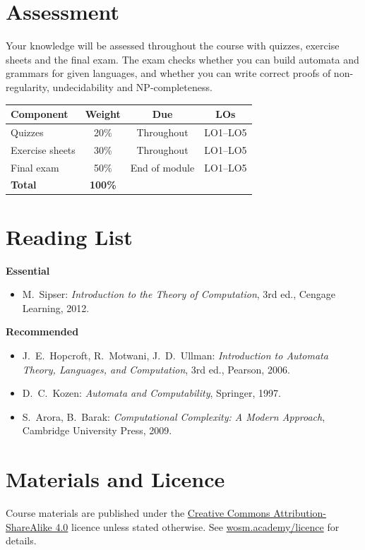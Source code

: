 \documentclass[11pt,a4paper]{article}
\begin{document}
\section{Assessment}
Your knowledge will be assessed throughout the course with quizzes, exercise sheets
and the final exam. The exam checks whether you can build automata and grammars for
given languages, and whether you can write correct proofs of non-regularity,
undecidability and NP-completeness.

\begin{tabularx}{\textwidth}{X c c c}
\toprule
\textbf{Component} & \textbf{Weight} & \textbf{Due} & \textbf{LOs} \\
\midrule
Quizzes & 20\% & Throughout & LO1--LO5 \\
Exercise sheets & 30\% & Throughout & LO1--LO5 \\
Final exam & 50\% & End of module & LO1--LO5 \\
\midrule
\textbf{Total} & \textbf{100\%} & & \\
\bottomrule
\end{tabularx}

\section{Reading List}
\textbf{Essential}
\begin{itemize}
  \item M.\ Sipser: \textit{Introduction to the Theory of Computation}, 3rd ed., Cengage Learning, 2012.
\end{itemize}
\textbf{Recommended}
\begin{itemize}
  \item J.\ E.\ Hopcroft, R.\ Motwani, J.\ D.\ Ullman: \textit{Introduction to Automata Theory, Languages, and Computation}, 3rd ed., Pearson, 2006.
  \item D.\ C.\ Kozen: \textit{Automata and Computability}, Springer, 1997.
  \item S.\ Arora, B.\ Barak: \textit{Computational Complexity: A Modern Approach}, Cambridge University Press, 2009.
\end{itemize}

\section{Materials and Licence}
Course materials are published under the
\href{https://creativecommons.org/licenses/by-sa/4.0/}{Creative Commons Attribution-ShareAlike 4.0}
licence unless stated otherwise. See \href{https://wosm.academy/licence/}{wosm.academy/licence} for details.
\end{document}
